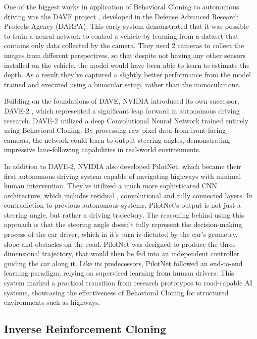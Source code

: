 One of the biggest works in application of Behavioral Cloning to autonomous driving was the DAVE project \autocite{muller2004autonomous}, developed in the Defense Advanced Research Projects Agency (DARPA). This early system demonstrated that it was possible to train a neural network to control a vehicle by learning from a dataset that contains only data collected by the camera. They used 2 cameras to collect the images from different perspectives, so that despite not having any other sensors installed on the vehicle, the model would have been able to learn to estimate the depth. As a result they've captured a slightly better performance from the model trained and executed using a binocular setup, rather than the monocular one.

Building on the foundations of DAVE, NVIDIA introduced its own successor, DAVE-2 \autocite{bojarski2016endendlearningselfdriving}, which represented a significant leap forward in autonomous driving research. DAVE-2 utilized a deep Convolutional Neural Network trained entirely using Behavioral Cloning. By processing raw pixel data from front-facing cameras, the network could learn to output steering angles, demonstrating impressive lane-following capabilities in real-world environments.

In addition to DAVE-2, NVIDIA also developed PilotNet, which became their first autonomous driving system capable of navigating highways with minimal human intervention. They've utilized a much more sophisticated CNN architecture, which includes residual \autocite{he2015deepresiduallearningimage}, convolutional and fully connected layers. In contradiction to previous autonomous systems, PilotNet's output is not just a steering angle, but rather a driving trajectory. The reasoning behind using this approach is that the steering angle doesn't fully represent the decision-making process of the car driver, which in it's turn is dictated by the car's geometry, slope and obstacles on the road. PilotNet was designed to produce the three-dimensional trajectory, that would then be fed into an independent controller guiding the car along it. Like its predecessors, PilotNet followed an end-to-end learning paradigm, relying on supervised learning from human drivers. This system marked a practical transition from research prototypes to road-capable AI systems, showcasing the effectiveness of Behavioral Cloning for structured environments such as highways.

\subsection{Inverse Reinforcement Cloning}
